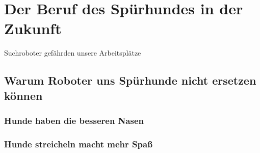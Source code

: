\chapter{Der Beruf des Spürhundes in der Zukunft}
Suchroboter gefährden unsere Arbeitsplätze

\section{Warum Roboter uns Spürhunde nicht ersetzen können}

\subsection{Hunde haben die besseren Nasen}


\subsection{Hunde streicheln macht mehr Spaß}

